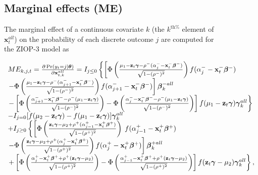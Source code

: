 \documentclass[letterpaper,fleqn,12pt]{article}
\begin{document}
\begin{figure}[H]
\begin{onehalfspace}
\subsection{Marginal effects (ME)}

\noindent The marginal effect of a continuous covariate $k$ (the $k^{\text{th%
}}$ element of $\mathbf{x}_{t}^{all}$) on the probability of each discrete
outcome $j$ are computed for the ZIOP-3 model as

\bigskip

$%
\begin{array}{l}
ME_{k,j,t}=\frac{\partial \Pr (y_{t}=j|\mathbf{\theta })}{\partial \mathbf{x}%
_{t,k}^{all}}=I_{j\leq 0}\left\{ \left[ \Phi \left( \frac{\mu _{1}-\mathbf{z}%
_{t}\mathbf{\gamma }-\rho ^{-}(\alpha _{j}^{-}-\mathbf{x}_{t}^{-}\mathbf{%
\beta ^{-})}}{\sqrt{1-(\rho ^{-})^{2}}}\right) f(\alpha _{j}^{-}-\mathbf{x}%
_{t}^{-}\mathbf{\beta ^{-}})\right. \right. \\ 
\left. -\Phi \left( \frac{\mu _{1}-\mathbf{z}_{t}\mathbf{\gamma }-\rho
^{-}(\alpha _{j+1}^{-}-\mathbf{x}_{t}^{-}\mathbf{\beta ^{-})}}{\sqrt{1-(\rho
^{-})^{2}}}\right) f(\alpha _{j+1}^{-}-\mathbf{x}_{t}^{-}\mathbf{\beta ^{-}})%
\right] \mathbf{\beta }_{k}^{-all} \\ 
\left. -\left[ \Phi \left( \frac{\alpha _{j+1}^{-}-\mathbf{x}_{t}^{-}\mathbf{%
\beta ^{-}}-\rho ^{-}(\mu _{1}-\mathbf{z}_{t}\mathbf{\gamma )}}{\sqrt{%
1-(\rho ^{-})^{2}}}\right) -\Phi \left( \frac{\alpha _{j}^{-}-\mathbf{x}%
_{t}^{-}\mathbf{\beta ^{-}}-\rho ^{-}(\mu _{1}-\mathbf{z}_{t}\mathbf{\gamma )%
}}{\sqrt{1-(\rho ^{-})^{2}}}\right) \right] f(\mu _{1}-\mathbf{z}_{t}\mathbf{%
\gamma })\mathbf{\gamma }_{k}^{all}\right\} \\ 
-I_{j=0}[f(\mu _{2}-\mathbf{z}_{t}\mathbf{\gamma })-f(\mu _{1}-\mathbf{z}_{t}%
\mathbf{\gamma })]\mathbf{\gamma }_{k}^{all} \\ 
+I_{j\geq 0}\left\{ \left[ \Phi \left( \frac{\mathbf{z}_{t}\mathbf{\gamma }%
-\mu _{2}+\rho ^{+}(\alpha _{j-1}^{+}-\mathbf{x}_{t}^{+}\mathbf{\beta ^{+})}%
}{\sqrt{1-(\rho ^{+})^{2}}}\right) \right. \right. f(\alpha _{j-1}^{+}-%
\mathbf{x}_{t}^{+}\mathbf{\beta ^{+}}) \\ 
\left. -\Phi \left( \frac{\mathbf{z}_{t}\mathbf{\gamma }-\mu _{2}+\rho
^{+}(\alpha _{j}^{+}-\mathbf{x}_{t}^{+}\mathbf{\beta ^{+})}}{\sqrt{1-(\rho
^{+})^{2}}}\right) f(\alpha _{j}^{+}-\mathbf{x}_{t}^{+}\mathbf{\beta ^{+}})%
\right] \mathbf{\beta }_{k}^{+all} \\ 
\left. +\left[ \Phi \left( \frac{\alpha _{j}^{+}-\mathbf{x}_{t}^{+}\mathbf{%
\beta ^{+}}+\rho ^{+}(\mathbf{z}_{t}\mathbf{\gamma }-\mu _{2}\mathbf{)}}{%
\sqrt{1-(\rho ^{+})^{2}}}\right) -\Phi \left( \frac{\alpha _{j-1}^{+}-%
\mathbf{x}_{t}^{+}\mathbf{\beta ^{+}}+\rho ^{+}(\mathbf{z}_{t}\mathbf{\gamma 
}-\mu _{2}\mathbf{)}}{\sqrt{1-(\rho ^{+})^{2}}}\right) \right] f(\mathbf{z}%
_{t}\mathbf{\gamma }-\mu _{2})\mathbf{\gamma }_{k}^{all}\right\} ,%
\end{array}%
$


\end{onehalfspace}
\end{figure}
\end{document}
